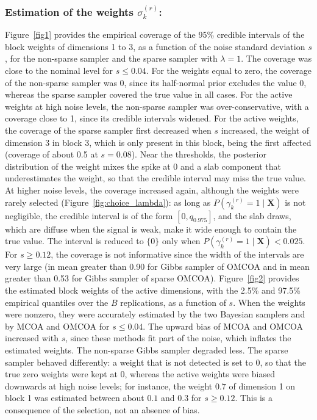 \documentclass[11pt]{article}
\newcommand{\X}{\mathbf{X}}
\begin{document}
\subsubsection*{Estimation of the weights $\sigma_k^{(r)}$:}
Figure~\ref{fig1} provides the empirical coverage of the 95\% credible intervals of the block weights of dimensions 1 to 3, as a function of the noise standard deviation $s$, for the non-sparse sampler and the sparse sampler with $\lambda=1$. The coverage was close to the nominal level for $s\leq0.04$. For the weights equal to zero, the coverage of the non-sparse sampler was 0, since its half-normal prior excludes the value 0, whereas the sparse sampler covered the true value in all cases. For the active weights at high noise levels, the non-sparse sampler was over-conservative, with a coverage close to 1, since its credible intervals widened. For the active weights, the coverage of the sparse sampler first decreased when $s$ increased, the weight of dimension 3 in block 3, which is only present in this block, being the first affected (coverage of about 0.5 at $s=0.08$). Near the thresholds, the posterior distribution of the weight mixes the spike at 0 and a slab component that underestimates the weight, so that the credible interval may miss the true value. At higher noise levels, the coverage increased again, although the weights were rarely selected (Figure~\ref{fig:choice_lambda}): as long as $P(\gamma_k^{(r)}=1\mid\X)$ is not negligible, the credible interval is of the form $[0,q_{0.975}]$, and the slab draws, which are diffuse when the signal is weak, make it wide enough to contain the true value. The interval is reduced to $\{0\}$ only when $P(\gamma_k^{(r)}=1\mid\X)<0.025$. For $s\geq 0.12$, the coverage is  not informative since the width of the intervals are very large (in mean greater than 0.90 for Gibbs sampler of OMCOA and in mean greater than 0.53 for Gibbs sampler of sparse OMCOA). Figure~\ref{fig2} provides the estimated block weights of the active dimensions, with the 2.5\% and 97.5\% empirical quantiles over the $B$ replications, as a function of $s$. When the weights were nonzero, they were accurately estimated by the two Bayesian samplers and by MCOA and OMCOA for $s\leq0.04$. The upward bias of MCOA and OMCOA increased with $s$, since these methods fit part of the noise, which inflates the estimated weights. The non-sparse Gibbs sampler degraded less. The sparse sampler behaved differently: a weight that is not detected is set to 0, so that the true zero weights were kept at 0, whereas the active weights were biased downwards at high noise levels; for instance, the weight $0.7$ of dimension 1 on block 1 was estimated between about $0.1$ and $0.3$ for $s\geq0.12$. This is a consequence of the selection, not an absence of bias.
\end{document}
